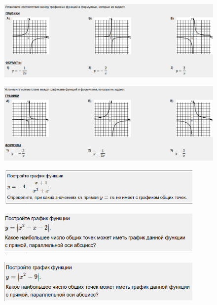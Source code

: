 
\begin{figure}[h!]
	\centering
	\includegraphics[width=1\textwidth]{img/preobr_t1.png}
\end{figure}

\begin{figure}[h!]
	\centering
	\includegraphics[width=1\textwidth]{img/preobr_t2.png}
\end{figure}

\begin{figure}[h!]
	\centering
	\includegraphics[width=0.9\textwidth]{img/preobr_t3.png}
\end{figure}

\begin{figure}[h!]
	\centering
	\includegraphics[width=0.9\textwidth]{img/preobr_t4.png}
\end{figure}

\begin{figure}[h!]
	\centering
	\includegraphics[width=0.9\textwidth]{img/preobr_t5.png}
\end{figure}

